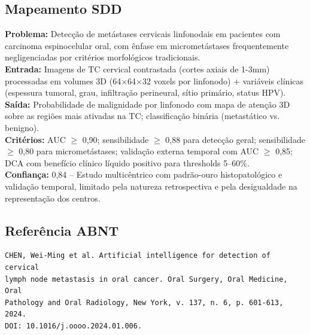\subsection{Mapeamento SDD}
\textbf{Problema:} Detecção de metástases cervicais linfonodais em pacientes
com carcinoma espinocelular oral, com ênfase em micrometástases
frequentemente negligenciadas por critérios morfológicos tradicionais. \\
\textbf{Entrada:} Imagens de TC cervical contrastada (cortes axiais de
1-3mm) processadas em volumes 3D (64$\times$64$\times$32 voxels por
linfonodo) + variáveis clínicas (espessura tumoral, grau, infiltração
perineural, sítio primário, status HPV). \\
\textbf{Saída:} Probabilidade de malignidade por linfonodo com mapa de
atenção 3D sobre as regiões mais ativadas na TC; classificação binária
(metastático vs. benigno). \\
\textbf{Critérios:} AUC $\geq$ 0,90; sensibilidade $\geq$ 0,88 para
detecção geral; sensibilidade $\geq$ 0,80 para micrometástases; validação
externa temporal com AUC $\geq$ 0,85; DCA com benefício clínico líquido
positivo para thresholds 5--60\%. \\
\textbf{Confiança:} 0,84 -- Estudo multicêntrico com padrão-ouro
histopatológico e validação temporal, limitado pela natureza retrospectiva
e pela desigualdade na representação dos centros.

\subsection{Referência ABNT}
\begin{verbatim}
CHEN, Wei-Ming et al. Artificial intelligence for detection of cervical
lymph node metastasis in oral cancer. Oral Surgery, Oral Medicine, Oral
Pathology and Oral Radiology, New York, v. 137, n. 6, p. 601-613, 2024.
DOI: 10.1016/j.oooo.2024.01.006.
\end{verbatim}
\endinput
